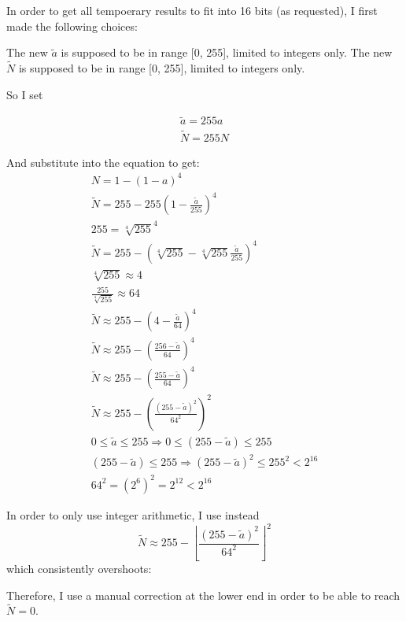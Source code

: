 \documentclass[12pt,a4paper,titlepage,oneside]{article}
\begin{document}
In order to get all tempoerary results to fit into 16 bits (as requested), I first made the following choices:

The new $ \tilde{a} $ is supposed to be in range [0, 255], limited to integers only.
The new $ \tilde{N} $ is supposed to be in range [0, 255], limited to integers only.

So I set

\begin{eqnarray*}
\tilde{a} = 255 a \\
\tilde{N} = 255 N
\end{eqnarray*}

And substitute into the equation to get:
\begin{eqnarray*}
N = 1 - (1 - a)^4 \\
\tilde{N} = 255 - 255 (1 - \frac{\tilde{a}}{255})^4 \\
255 = \sqrt[4]{255}^4 \\
\tilde{N} = 255 - \left(\sqrt[4]{255} - \sqrt[4]{255} \frac{\tilde{a}}{255}\right)^4 \\
\sqrt[4]{255} \approx 4 \\
\frac{255}{\sqrt[4]{255}} \approx 64 \\
\tilde{N} \approx 255 - \left(4 - \frac{\tilde{a}}{64}\right)^4 \\
\tilde{N} \approx 255 - \left(\frac{256 - \tilde{a}}{64}\right)^4 \\
\tilde{N} \approx 255 - \left(\frac{255 - \tilde{a}}{64}\right)^4 \\
\tilde{N} \approx 255 - \left(\frac{(255 - \tilde{a})^2}{64^2}\right)^2 \\
0 \le \tilde{a} \le 255 \Rightarrow 0 \le (255 - \tilde{a}) \le 255 \\
(255 - \tilde{a}) \le 255 \Rightarrow (255 - \tilde{a})^2 \le 255^2 < 2^{16} \\
64^2 = (2^6)^2 = 2^{12} < 2^{16}
\end{eqnarray*}

In order to only use integer arithmetic, I use instead \[\tilde{N} \approx 255 - \left\lfloor{\frac{(255 - \tilde{a})^2}{64^2}}\right\rfloor^2\] which consistently overshoots:

\begin{figure}[htb]
\begin{center}

\end{center}
\end{figure}

Therefore, I use a manual correction at the lower end in order to be able to reach $ \tilde{N} = 0 $.
\end{document}
